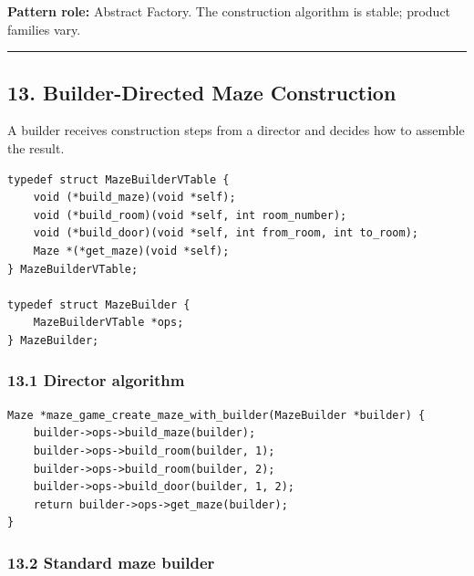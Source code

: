 \documentclass[11pt]{article}
\begin{document}
\textbf{Pattern role:} Abstract Factory. The construction algorithm is stable; product families vary.

\begin{center}\rule{0.5\linewidth}{0.5pt}\end{center}

\subsection{13. Builder-Directed Maze Construction}\label{builder-directed-maze-construction}

A builder receives construction steps from a director and decides how to assemble the result.

\begin{verbatim}
typedef struct MazeBuilderVTable {
    void (*build_maze)(void *self);
    void (*build_room)(void *self, int room_number);
    void (*build_door)(void *self, int from_room, int to_room);
    Maze *(*get_maze)(void *self);
} MazeBuilderVTable;

typedef struct MazeBuilder {
    MazeBuilderVTable *ops;
} MazeBuilder;
\end{verbatim}

\subsubsection{13.1 Director algorithm}\label{director-algorithm}

\begin{verbatim}
Maze *maze_game_create_maze_with_builder(MazeBuilder *builder) {
    builder->ops->build_maze(builder);
    builder->ops->build_room(builder, 1);
    builder->ops->build_room(builder, 2);
    builder->ops->build_door(builder, 1, 2);
    return builder->ops->get_maze(builder);
}
\end{verbatim}

\subsubsection{13.2 Standard maze builder}\label{standard-maze-builder}
\end{document}
